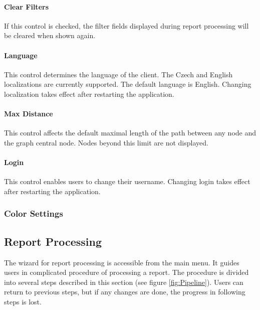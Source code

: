 \paragraph{Clear Filters} If this control is checked, the filter fields
displayed during report processing will be cleared when shown again.

\paragraph{Language} This control determines the language of the \textan{}
client. The Czech and English localizations are currently supported. The
default language is English. Changing localization takes effect after
restarting the application.

\paragraph{Max Distance} This control affects the default maximal length of the
path between any node and the graph central node. Nodes beyond this limit are
not displayed.

\paragraph{Login} This control enables users to change their username. Changing
login takes effect after restarting the application.

\subsubsection{Color Settings}

\subsection{Report Processing}
\label{ssec:ProcessReport}

The wizard for report processing is accessible from the main menu. It guides
users in complicated procedure of processing a report. The procedure is divided
into several steps described in this section (see figure \ref{fig:Pipeline}).
Users can return to previous steps, but if any changes are done, the progress
in following steps is lost.

